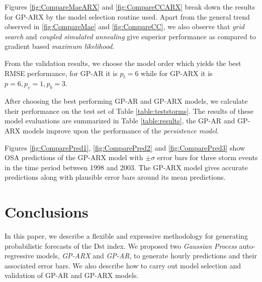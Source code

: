 Figures \ref{fig:CompareMaeARX} and \ref{fig:CompareCCARX} break down the results for GP-ARX by the model selection routine used. Apart from the general trend observed in \ref{fig:CompareMae} and \ref{fig:CompareCC}, we also observe that \emph{grid search} and \emph{coupled simulated annealing} give superior performance as compared to gradient based \emph{maximum likelihood}.

From the validation results, we choose the model order which yields the best RMSE performance, for GP-AR it is $p_t = 6$ while for GP-ARX it is $p = 6, p_v = 1, p_b = 3$.

After choosing the best performing GP-AR and GP-ARX models, we calculate their performance on the test set of Table \ref{table:teststorms}. The results of these model evaluations are summarized in Table \ref{table:results}, the GP-AR and GP-ARX models improve upon the performance of the \emph{persistence model}.

Figures \ref{fig:ComparePred1}, \ref{fig:ComparePred2} and \ref{fig:ComparePred3} show OSA predictions of the GP-ARX model with $\pm \sigma$ error bars for three storm events in the time period between 1998 and 2003. The GP-ARX model gives accurate predictions along with plausible error bars around its mean predictions.

\section{Conclusions}

In this paper, we describe a flexible and expressive methodology for generating probabilistic forecasts of the $ \mathrm{Dst}$ index. We proposed two \emph{Gaussian Process} auto-regressive models, \emph{GP-ARX} and \emph{GP-AR}, to generate hourly predictions and their associated error bars. We also describe how to carry out model selection and validation of GP-AR and GP-ARX models.


